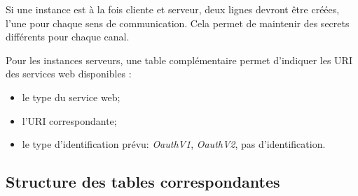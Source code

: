 Si une instance est à la fois cliente et serveur, deux lignes devront être créées, l'une pour chaque sens de communication. Cela permet de maintenir des secrets différents pour chaque canal.

Pour les instances \og serveurs\fg{}, une table complémentaire permet d'indiquer les URI des services web disponibles :
\begin{itemize}
\item le type du service web;
\item l'URI correspondante;
\item le type d'identification prévu: \textit{OauthV1}, \textit{OauthV2}, pas d'identification.
\end{itemize}

\subsection{Structure des tables correspondantes}

